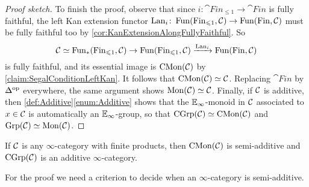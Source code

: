 \begin{proof}[Proof sketch]
	To finish the proof, observe that since $i\colon \cat{Fin}_{\leqslant 1}\rightarrow \cat{Fin}$ is fully faithful, the left Kan extension functor $\operatorname{Lan}_{i}\colon \operatorname{Fun}(\mathrm{Fin}_{\leqslant 1},\mathcal{C})\rightarrow \operatorname{Fun}(\mathrm{Fin},\mathcal{C})$ must be fully faithful too by \cref{cor:KanExtensionAlongFullyFaithful}. So
	\begin{equation*}
		\Cc\simeq \Fun_*\left(\cat{Fin}_{\leqslant 1},\Cc\right)\rightarrow \Fun\left(\cat{Fin}_{\leqslant 1},\Cc\right)\xrightarrow{\Lan_i}\Fun\left(\cat{Fin},\Cc\right)
	\end{equation*}
	is fully faithful, and its essential image is $\mathrm{CMon}(\mathcal{C})$ by \cref{claim:SegalConditionLeftKan}. It follows that $\mathrm{CMon}(\mathcal{C})\simeq \mathcal{C}$. Replacing $\cat{Fin}$ by $\IDelta^\op$ everywhere, the same argument shows $\mathrm{Mon}(\mathcal{C})\simeq \mathcal{C}$. Finally, if $\mathcal{C}$ is additive, then \cref{def:Additive}\cref{enum:Additive} shows that the $\mathbb{E}_\infty$-monoid in $\mathcal{C}$ associated to $x\in\mathcal{C}$ is automatically an $\mathbb{E}_\infty$-group, so that $\mathrm{CGrp}(\mathcal{C})\simeq \mathrm{CMon}(\mathcal{C})$ and $\mathrm{Grp}(\mathcal{C})\simeq \mathrm{Mon}(\mathcal{C})$.
\end{proof}
\begin{lem}\label{lem:CGrpAdditive}
	If $\mathcal{C}$ is any $\infty$-category with finite products, then $\mathrm{CMon}(\mathcal{C})$ is semi-additive and $\mathrm{CGrp}(\mathcal{C})$ is an additive $\infty$-category.
\end{lem}
For the proof we need a criterion to decide when an $\infty$-category is semi-additive. %
